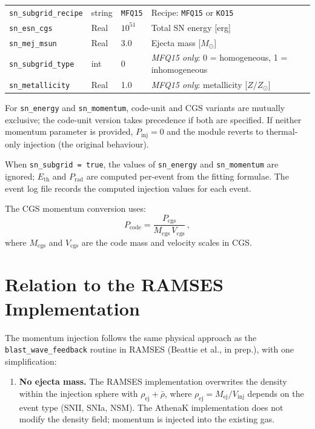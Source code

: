 \documentclass[11pt]{article}
\begin{document}
\begin{table}[h]
\begin{tabular}{@{}llll@{}}
\texttt{sn\_subgrid\_recipe} & string & \texttt{MFQ15}  & Recipe: \texttt{MFQ15} or \texttt{KO15} \\
\texttt{sn\_esn\_cgs}        & Real   & $10^{51}$       & Total SN energy [erg] \\
\texttt{sn\_mej\_msun}       & Real   & 3.0             & Ejecta mass [$M_\odot$] \\
\texttt{sn\_subgrid\_type}   & int    & 0               & \emph{MFQ15 only}: 0 = homogeneous, 1 = inhomogeneous \\
\texttt{sn\_metallicity}     & Real   & 1.0             & \emph{MFQ15 only}: metallicity [$Z/Z_\odot$] \\
\bottomrule
\end{tabular}
\end{table}

For \texttt{sn\_energy} and \texttt{sn\_momentum}, code-unit and CGS variants
are mutually exclusive; the code-unit version takes precedence if both are
specified.  If neither momentum parameter is provided, $P_\mathrm{inj} = 0$ and
the module reverts to thermal-only injection (the original behaviour).

When \texttt{sn\_subgrid = true}, the values of \texttt{sn\_energy} and
\texttt{sn\_momentum} are ignored; $E_\mathrm{th}$ and $P_\mathrm{rad}$ are
computed per-event from the fitting formulae.  The event log file records the
computed injection values for each event.

The CGS momentum conversion uses:
\begin{equation}
  P_\mathrm{code} = \frac{P_\mathrm{cgs}}{M_\mathrm{cgs}\,V_\mathrm{cgs}}\,,
\end{equation}
where $M_\mathrm{cgs}$ and $V_\mathrm{cgs}$ are the code mass and velocity
scales in CGS.

\section{Relation to the RAMSES Implementation}

The momentum injection follows the same physical approach as the
\texttt{blast\_wave\_feedback} routine in RAMSES (Beattie et al., in prep.),
with one simplification:

\begin{enumerate}
  \item \textbf{No ejecta mass.}  The RAMSES implementation overwrites the
    density within the injection sphere with $\rho_\mathrm{ej} + \bar{\rho}$,
    where $\rho_\mathrm{ej} = M_\mathrm{ej} / V_\mathrm{inj}$ depends on the
    event type (SNII, SNIa, NSM).  The AthenaK implementation does not modify
    the density field; momentum is injected into the existing gas.
\end{enumerate}
\end{document}
